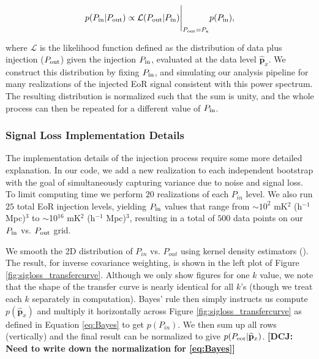 \documentclass[preprint2,numberedappendix,tighten]{aastex6}  %
\newcommand{\phat}{\widehat{\mathbf{p}}}
\newcommand{\dcj}[1]{{\color{orange} \textbf{[DCJ: #1]}}}
\begin{document}
\begin{equation}
\label{eq:Bayes}
p(P_{\rm in} | P_{\rm out}) \propto \evalat[\Bigg]{\mathcal{L} (  P_{\rm out} | P_{\rm in})}{P_{\rm out}=P_{\rm x}}
  p(P_{\rm in}) ,
\end{equation}

\noindent where $\mathcal{L} $ is the likelihood function defined 
as the distribution of data plus injection ($P_{\rm out}$) given the injection $P_{\rm in}$, evaluated at the data level $\phat_x$.  We construct this distribution  
by fixing $P_{\rm in}$, and simulating our analysis pipeline for many realizations of the injected EoR signal 
consistent with this power spectrum. The resulting distribution is normalized such that the sum is unity, and the 
whole process can then be repeated for a different value of $P_{\rm in}$. 

\subsubsection{Signal Loss Implementation Details}
\label{sec:Implementation}

The implementation details of the injection process require some more detailed explanation. In our code, we add a new realization to each independent bootstrap with the goal of simultaneously capturing variance due to noise and signal loss. To limit computing time we perform $20$ realizations of each $P_{in}$ level. We also run $25$ total EoR injection levels, yielding $P_{\rm in}$ values that range from $\sim$$10^{2}$ mK$^{2}$ (h$^{-1}$ Mpc)$^{3}$ to $\sim$10$^{16}$ mK$^{2}$ (h$^{-1}$ Mpc)$^{3}$, resulting in a total of $500$ data points on our $P_{\rm in}$ vs. $P_{\rm out}$ grid. 

We smooth the 2D distribution of $P_{in}$ vs. $P_{out}$ using kernel density estimators (\citealt{scott2008kernel}). 
The result, for inverse covariance weighting, is shown in the left plot of Figure \ref{fig:sigloss_transfercurve}.  
Although we only show figures for one $k$ value, we note that 
the shape of the transfer curve is nearly identical for all $k$'s (though we treat each $k$ separately in computation). Bayes' rule 
then simply instructs us compute $p(\phat_{x})$ and multiply it horizontally across Figure \ref{fig:sigloss_transfercurve} as defined in Equation \eqref{eq:Bayes} to get $p(P_{in})$. We then sum up all rows (vertically) and the final result can be normalized to give $p(P_{\rm eor} | \phat_{x})$. 
\dcj{Need to write down the normalization for \eqref{eq:Bayes}}
\end{document}
